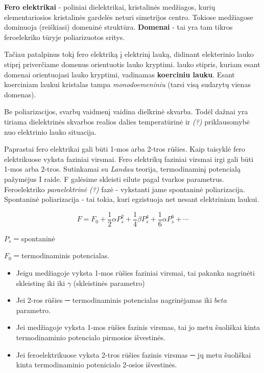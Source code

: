 \textbf{Fero elektrikai} - poliniai dielektrikai,
kristalinės medžiagos, kurių elementariosios kristalinės gardelės neturi simetrijos centro.
Tokiose medžiagose dominuoja (reiškiasi) domeninė struktūra.
\textbf{Domenai} - tai yra tam tikros feroelekriko tūryje poliarizuotos sritys.

Tačiau patalpinus tokį fero elektriką į elektrinį lauką,
didinant elekterinio lauko stiprį priverčiame domenus orientuotis lauko kryptimi.
lauko stipris, kuriam esant domenai orientuojasi lauko kryptimi,
vadinamas \textbf{koerciniu lauku}.
Esant koerciniam laukui kristalas tampa \textit{monodoemeniniu} (tarsi visą sudarytų vienas domenas).

Be poliarizacijos, svarbų vaidmenį vaidina dielkrinė skvarba.
Todėl dažnai yra tiriama dielektrinės skvarbos realios dalies temperatūrinė ir \textit{(?)} priklausomybė nuo elektrinio lauko situacija.

Paprastai fero elektrikai gali būti 1-mos arba 2-tros rūšies.
Kaip taisyklė fero elektrikuose vyksta faziniai virsmai.
Fero elektrikų faziniai virsmai irgi gali būti 1-mos arba 2-tros.
Sutinkamai su \textit{Landau} teorija, termodinaminį potencialą pažymėjus
I raide. F galėsime skleisti eilute pagal tvarkos parametrus.
Feroelektriko \textit{paraelektrinė} \textit{(?)} fazė - vykstanti jame spontaninė poliarizacija.
Spontaninė poliarizacija - tai tokia, kuri egzistuoja net nesant elektriniam
laukui.

\begin{equation*}
  F = F_0 + \frac{1}{2}\alpha P_s^2 +
  \frac{1}{4}\beta P_s^4 + \frac{1}{6}\alpha P_s^6 + \cdots
\end{equation*}

$P_s$ ─ spontaninė

$F_0$ ─ termodinaminis potencialas.

\begin{itemize}
  \item Jeigu medžiagoje vyksta 1-mos rūšies faziniai virsmai,
  tai pakanka nagrinėti skleistinę iki iki $\gamma$ (skleistinės parametro)
  \item Jei 2-ros rūšies ─ termodinaminis potencialas nagrinėjamas iki $beta$
  parametro.
\end{itemize}

\begin{itemize}
  \item Jei medžiagoje vyksta 1-mos rūšies fazinis virsmas,
  tai jo metu šuoliškai kinta termodinaminio potencialo pirmosios išvestinės.
  \item Jei feroelektrikuose vyksta 2-tros rūšies fazinis virsmas
  ─ jų metu šuoliškai kinta termodinaminio potenicialo 2-osios išvestinės.
\end{itemize}

